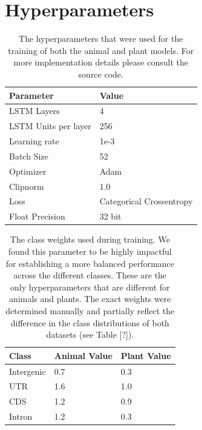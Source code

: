 \documentclass{article}
\renewcommand{\thetable}{S\arabic{table}}
\begin{document}
\section{Hyperparameters}
\label{sec:hyperparameters}
\begin{table}[!h]
\centering
\begin{tabular}{@{}ll@{}}
\hline
Parameter & Value \\ [0.5ex]
\hline
LSTM Layers & 4 \\
LSTM Units per layer & 256 \\
Learning rate & 1e-3 \\
Batch Size & 52 \\
Optimizer & Adam \\
Clipnorm & 1.0 \\
Loss & Categorical Crossentropy \\
Float Precision & 32 bit \\
\hline
\end{tabular}
\caption{The hyperparameters that were used for the training of both the animal and plant models. For more implementation details please consult the source code.}
\label{suptab:params}
\end{table}

\begin{table}[!h]
\centering
\begin{tabular}{@{}lll@{}}
\hline
Class & Animal Value & Plant Value \\ [0.5ex]
\hline
Intergenic & 0.7 & 0.3 \\
UTR & 1.6 & 1.0 \\
CDS & 1.2 & 0.9 \\
Intron & 1.2 & 0.3 \\
\hline
\end{tabular}
\caption{The class weights used during training. We found this parameter to be highly impactful for establishing a more balanced performance across the different classes. These are the only hyperparameters that are different for animals and plants. The exact weights were determined manually and partially reflect the difference in the class distributions of both datasets (see Table [?]).}
\label{suptab:classweights}
\end{table}


\newpage
\end{document}
